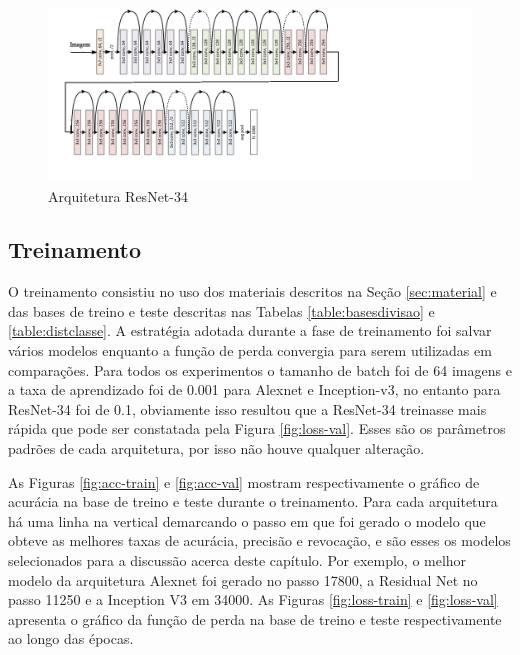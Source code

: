 \begin{figure}
\centering
\includegraphics[scale=0.83]{figuras/resnet-34.png}
\caption{Arquitetura ResNet-34}
\label{fig:resnet-34}
\end{figure}



\subsection{Treinamento}
O treinamento consistiu no uso dos materiais descritos na Seção \ref{sec:material} e das bases de treino e teste descritas nas Tabelas \ref{table:basesdivisao} e \ref{table:distclasse}. A estratégia adotada durante a fase de treinamento foi salvar vários modelos enquanto a função de perda convergia para serem utilizadas em comparações. Para todos os experimentos o tamanho de batch foi de 64 imagens e a taxa de aprendizado foi de 0.001 para Alexnet e Inception-v3, no entanto para ResNet-34 foi de 0.1, obviamente isso resultou que a ResNet-34 treinasse mais rápida que pode ser constatada pela Figura \ref{fig:loss-val}. Esses são os parâmetros padrões de cada arquitetura, por isso não houve qualquer alteração. 

As Figuras \ref{fig:acc-train} e \ref{fig:acc-val} mostram respectivamente o gráfico de acurácia na base de treino e teste durante o treinamento. Para cada arquitetura há uma linha na vertical demarcando o passo em que foi gerado o modelo que obteve as melhores taxas de acurácia, precisão e revocação, e são esses os modelos selecionados para a discussão acerca deste capítulo. Por exemplo, o melhor modelo da arquitetura Alexnet foi gerado no passo 17800, a Residual Net no passo 11250 e a Inception V3 em 34000. As Figuras \ref{fig:loss-train} e \ref{fig:loss-val} apresenta o gráfico da função de perda na base de treino e teste respectivamente ao longo das épocas.


